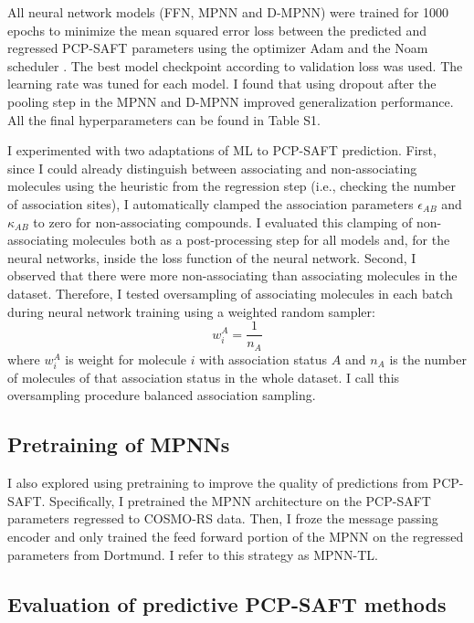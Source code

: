 All neural network models (FFN, MPNN and D-MPNN) were trained for 1000 epochs to minimize the mean squared error loss between the predicted and regressed PCP-SAFT parameters using the optimizer Adam \cite{Kingma2015} and the Noam scheduler \cite{Vaswani2017}. The best model checkpoint according to validation loss was used. The learning rate was tuned for each model. I found that using dropout after the pooling step in the MPNN and D-MPNN improved generalization performance. All the final hyperparameters can be found in Table S1.

I experimented with two adaptations of ML to PCP-SAFT prediction. First, since I could already distinguish between associating and non-associating molecules using the heuristic from the regression step (i.e., checking the number of association sites), I automatically clamped the association parameters $\epsilon_{AB}$ and $\kappa_{AB}$ to zero for non-associating compounds. I evaluated this clamping of non-associating molecules both as a post-processing step for all models and, for the neural networks, inside the loss function of the neural network. Second, I observed that there were more non-associating than associating molecules in the dataset. Therefore, I tested oversampling of associating molecules in each batch during neural network training using a weighted random sampler:
\begin{equation}
    w_i^{A} = \frac{1}{n_A}
\end{equation}
where $w_i^{A}$ is weight for molecule $i$ with association status $A$ and $n_A$ is the number of molecules of that association status in the whole dataset. I call this oversampling procedure balanced association sampling.

\subsection{Pretraining of MPNNs}

I also explored using pretraining to improve the quality of predictions from PCP-SAFT. Specifically, I pretrained the MPNN architecture on the PCP-SAFT parameters regressed to COSMO-RS data. Then, I froze the message passing encoder and only trained the feed forward portion of the MPNN on the regressed parameters from Dortmund. I refer to this strategy as MPNN-TL.

\subsection{Evaluation of predictive PCP-SAFT methods}

